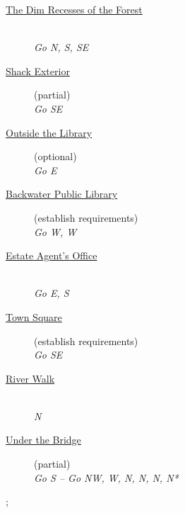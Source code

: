 \documentclass[a5paper]{extarticle}
\begin{document}
\newpage{}\label{sec:route-1}
\begin{description}
\item[{\hyperref[sec:req-The-Dim-Recesses-of-the-Forest]{The Dim Recesses of the Forest}}] ~\\
  \emph{Go N, S, SE}
\item[{\hyperref[sec:req-Shack-Exterior-0]{Shack Exterior}}] (partial)\\
  \emph{Go SE}
\item[{\hyperref[sec:req-Outside-the-Library]{Outside the Library}}] (optional)\\
  \emph{Go E}
\item[{\hyperref[sec:req-Public-Library-0]{Backwater Public Library}}] (establish requirements)\\
  \emph{Go W, W}
\item[{\hyperref[sec:req-Estate-Agent's-Office]{Estate Agent's Office}}] ~\\
  \emph{Go E, S}
\item[{\hyperref[sec:req-Town-Square-0]{Town Square}}] (establish requirements)\\
  \emph{Go SE}
\item[{\hyperref[sec:req-River-Walk]{River Walk}}] ~\\
  \emph{N}
\item[{\hyperref[sec:req-Under-the-Bridge-0]{Under the Bridge}}] (partial)\\
  \emph{Go S -- Go NW, W, N, N, N, N*}
\end{description}

\begin{adjustbox}{max width=\textwidth,center}
\sffamily\footnotesize
\begin{gamemap}
;
\end{gamemap}
\end{adjustbox}
\end{document}

